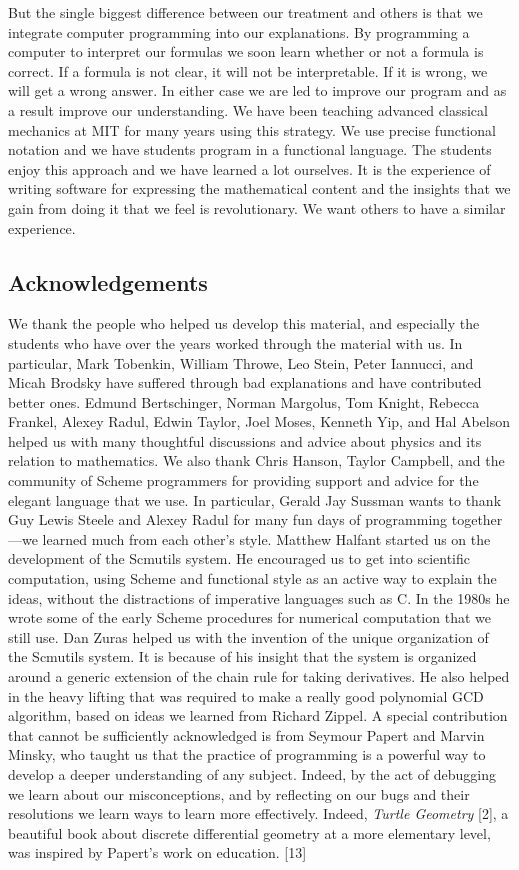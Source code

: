 \documentclass[11pt]{article}
\begin{document}
But the single biggest difference between our treatment and others is that we
integrate computer programming into our explanations. By programming a computer
to interpret our formulas we soon learn whether or not a formula is correct. If
a formula is not clear, it will not be interpretable. If it is wrong, we will
get a wrong answer. In either case we are led to improve our program and as a
result improve our understanding. We have been teaching advanced classical
mechanics at MIT for many years using this strategy. We use precise functional
notation and we have students program in a functional language. The students
enjoy this approach and we have learned a lot ourselves. It is the experience of
writing software for expressing the mathematical content and the insights that
we gain from doing it that we feel is revolutionary. We want others to have a
similar experience.

\subsection{Acknowledgements}
\label{sec:orgf79ceed}

We thank the people who helped us develop this material, and especially the
students who have over the years worked through the material with us. In
particular, Mark Tobenkin, William Throwe, Leo Stein, Peter Iannucci, and Micah
Brodsky have suffered through bad explanations and have contributed better ones.
Edmund Bertschinger, Norman Margolus, Tom Knight, Rebecca Frankel, Alexey Radul,
Edwin Taylor, Joel Moses, Kenneth Yip, and Hal Abelson helped us with many
thoughtful discussions and advice about physics and its relation to mathematics.
We also thank Chris Hanson, Taylor Campbell, and the community of Scheme
programmers for providing support and advice for the elegant language that we
use. In particular, Gerald Jay Sussman wants to thank Guy Lewis Steele and
Alexey Radul for many fun days of programming together—we learned much from each
other’s style. Matthew Halfant started us on the development of the Scmutils
system. He encouraged us to get into scientific computation, using Scheme and
functional style as an active way to explain the ideas, without the distractions
of imperative languages such as C. In the 1980s he wrote some of the early
Scheme procedures for numerical computation that we still use. Dan Zuras helped
us with the invention of the unique organization of the Scmutils system. It is
because of his insight that the system is organized around a generic extension
of the chain rule for taking derivatives. He also helped in the heavy lifting
that was required to make a really good polynomial GCD algorithm, based on ideas
we learned from Richard Zippel. A special contribution that cannot be
sufficiently acknowledged is from Seymour Papert and Marvin Minsky, who taught
us that the practice of programming is a powerful way to develop a deeper
understanding of any subject. Indeed, by the act of debugging we learn about our
misconceptions, and by reflecting on our bugs and their resolutions we learn
ways to learn more effectively. Indeed, \emph{Turtle Geometry} [2], a beautiful book
about discrete differential geometry at a more elementary level, was inspired by
Papert’s work on education. [13]
\end{document}
